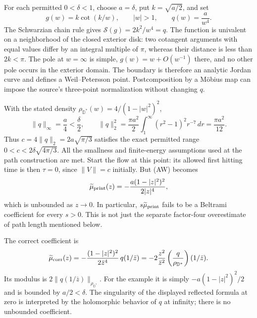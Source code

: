 \documentclass[10pt]{article}
\begin{document}
For each permitted \(0<\delta<1\), choose \(a=\delta\), put \(k=\sqrt{a/2}\), and set \[g(w)=k\cot(k/w),\qquad |w|>1,\qquad q(w)=\frac{a}{w^4}.\] The Schwarzian chain rule gives \(\mathcal S(g)=2k^2/w^4=q\). The function is univalent on a neighborhood of the closed exterior disk: two cotangent arguments with equal values differ by an integral multiple of \(\pi\), whereas their distance is less than \(2k<\pi\). The pole at \(w=\infty\) is simple, \(g(w)=w+O(w^{-1})\) there, and no other pole occurs in the exterior domain. The boundary is therefore an analytic Jordan curve and defines a Weil–Petersson point. Postcomposition by a Möbius map can impose the source’s three-point normalization without changing \(q\).\par
With the stated density \(\rho_{\mathbb D^*}(w)=4/(1-|w|^2)^2\), \[\|q\|_\infty=\frac a4<\frac\delta2,\qquad
 \|q\|_2^2
 =\frac{\pi a^2}{2}\int_1^\infty
       (r^2-1)^2r^{-7}\,dr
 =\frac{\pi a^2}{12}.\] Thus \(c=4\|q\|_2=2a\sqrt{\pi/3}\) satisfies the exact permitted range \(0<c<2\delta\sqrt{4\pi/3}\). All the smallness and finite-energy assumptions used at the path construction are met. Start the flow at this point: its allowed first hitting time is then \(\tau=0\), since \(\|V\|=c\) initially. But (AW) becomes \[\widetilde\mu_{\rm print}(z)
 =-\frac{a(1-|z|^2)^2}{2|z|^4},\] which is unbounded as \(z\to0\). In particular, \(s\widetilde\mu_{\rm print}\) fails to be a Beltrami coefficient for every \(s>0\). This is not just the separate factor-four overestimate of path length mentioned below.\par
The correct coefficient is \[\widetilde\mu_{\rm corr}(z)
 =-\frac{(1-|z|^2)^2}{2\bar z^4}\,q(1/\bar z)
 =-2\frac{z^2}{\bar z^2}
       \left(\frac{q}{\rho_{\mathbb D^*}}\right)(1/\bar z).\] Its modulus is \(2\|q(1/\bar z)\|_{\rho_{\mathbb D^*}}\). For the example it is simply \(-a(1-|z|^2)^2/2\) and is bounded by \(a/2<\delta\). The singularity of the displayed reflected formula at zero is interpreted by the holomorphic behavior of \(q\) at infinity; there is no unbounded coefficient.\par
\end{document}
